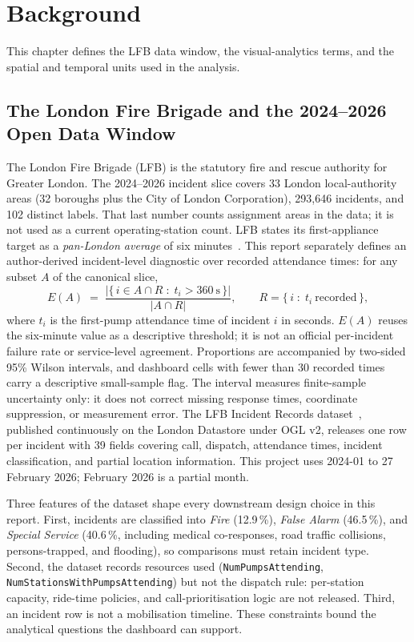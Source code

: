 \section{Background}\label{sec:background}

This chapter defines the LFB data window, the visual-analytics terms, and the spatial and temporal units used in the analysis.

\subsection{The London Fire Brigade and the 2024--2026 Open Data Window}\label{sec:background-lfb}

The London Fire Brigade (LFB) is the statutory fire and rescue authority for Greater London. The 2024--2026 incident slice covers 33 London local-authority areas (32 boroughs plus the City of London Corporation), 293{,}646 incidents, and 102 distinct  labels. That last number counts assignment areas in the data; it is not used as a current operating-station count. LFB states its first-appliance target as a \emph{pan-London average} of six minutes~\cite{lfb_attendance}. This report separately defines an author-derived incident-level diagnostic over recorded attendance times: for any subset $A$ of the canonical slice,
\begin{equation}
E(A) \;=\; \frac{\bigl|\{\, i \in A \cap R \;:\; t_i > 360\ \mathrm{s} \,\}\bigr|}{\bigl| A \cap R \bigr|},
\qquad
R = \{\, i \;:\; t_i\ \mathrm{recorded} \,\},
\label{eq:exceedance-share}
\end{equation}
where $t_i$ is the first-pump attendance time of incident $i$ in seconds. $E(A)$ reuses the six-minute value as a descriptive threshold; it is not an official per-incident failure rate or service-level agreement. Proportions are accompanied by two-sided 95\% Wilson intervals, and dashboard cells with fewer than 30 recorded times carry a descriptive small-sample flag. The interval measures finite-sample uncertainty only: it does not correct missing response times, coordinate suppression, or measurement error. The LFB Incident Records dataset~\cite{lfb_incidents}, published continuously on the London Datastore under OGL v2, releases one row per incident with 39 fields covering call, dispatch, attendance times, incident classification, and partial location information. This project uses 2024-01 to 27 February 2026; February 2026 is a partial month.

Three features of the dataset shape every downstream design choice in this report. First, incidents are classified into \emph{Fire} (12.9\,\%), \emph{False Alarm} (46.5\,\%), and \emph{Special Service} (40.6\,\%, including medical co-responses, road traffic collisions, persons-trapped, and flooding), so comparisons must retain incident type. Second, the dataset records resources used (\texttt{NumPumpsAttending}, \texttt{NumStationsWithPumpsAttending}) but not the dispatch rule: per-station capacity, ride-time policies, and call-prioritisation logic are not released. Third, an incident row is not a mobilisation timeline. These constraints bound the analytical questions the dashboard can support.

